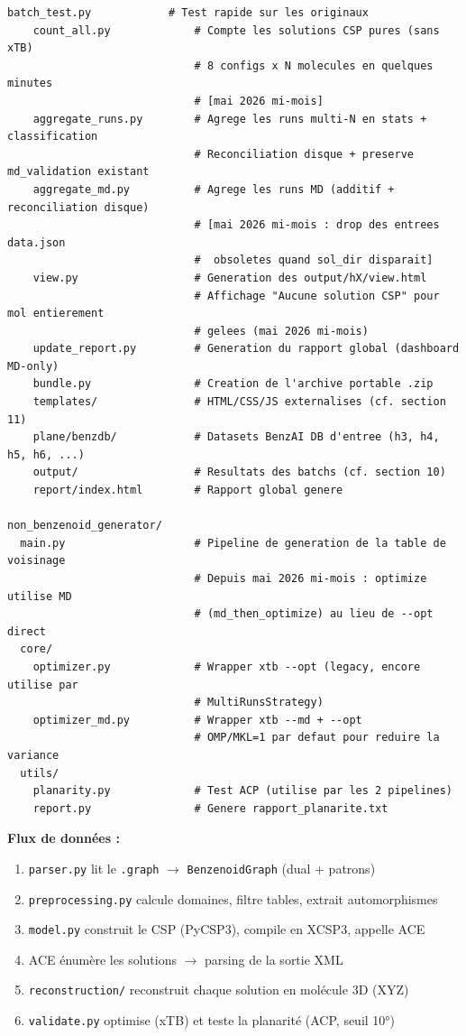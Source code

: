 \begin{lstlisting}[style=benzai]
    batch_test.py            # Test rapide sur les originaux
    count_all.py             # Compte les solutions CSP pures (sans xTB)
                             # 8 configs x N molecules en quelques minutes
                             # [mai 2026 mi-mois]
    aggregate_runs.py        # Agrege les runs multi-N en stats + classification
                             # Reconciliation disque + preserve md_validation existant
    aggregate_md.py          # Agrege les runs MD (additif + reconciliation disque)
                             # [mai 2026 mi-mois : drop des entrees data.json
                             #  obsoletes quand sol_dir disparait]
    view.py                  # Generation des output/hX/view.html
                             # Affichage "Aucune solution CSP" pour mol entierement
                             # gelees (mai 2026 mi-mois)
    update_report.py         # Generation du rapport global (dashboard MD-only)
    bundle.py                # Creation de l'archive portable .zip
    templates/               # HTML/CSS/JS externalises (cf. section 11)
    plane/benzdb/            # Datasets BenzAI DB d'entree (h3, h4, h5, h6, ...)
    output/                  # Resultats des batchs (cf. section 10)
    report/index.html        # Rapport global genere

non_benzenoid_generator/
  main.py                    # Pipeline de generation de la table de voisinage
                             # Depuis mai 2026 mi-mois : optimize utilise MD
                             # (md_then_optimize) au lieu de --opt direct
  core/
    optimizer.py             # Wrapper xtb --opt (legacy, encore utilise par
                             # MultiRunsStrategy)
    optimizer_md.py          # Wrapper xtb --md + --opt
                             # OMP/MKL=1 par defaut pour reduire la variance
  utils/
    planarity.py             # Test ACP (utilise par les 2 pipelines)
    report.py                # Genere rapport_planarite.txt
\end{lstlisting}

\textbf{Flux de données :}

\begin{enumerate}
  \item \texttt{parser.py} lit le \texttt{.graph} $\to$ \texttt{BenzenoidGraph} (dual + patrons)
  \item \texttt{preprocessing.py} calcule domaines, filtre tables, extrait automorphismes
  \item \texttt{model.py} construit le CSP (PyCSP3), compile en XCSP3, appelle ACE
  \item ACE énumère les solutions $\to$ parsing de la sortie XML
  \item \texttt{reconstruction/} reconstruit chaque solution en molécule 3D (XYZ)
  \item \texttt{validate.py} optimise (xTB) et teste la planarité (ACP, seuil 10°)
\end{enumerate}

